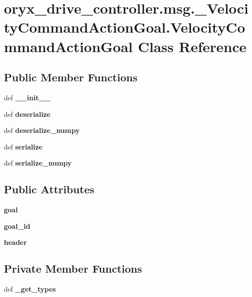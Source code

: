 \section{oryx\-\_\-drive\-\_\-controller.\-msg.\-\_\-\-Velocity\-Command\-Action\-Goal.\-Velocity\-Command\-Action\-Goal \-Class \-Reference}
\label{classoryx__drive__controller_1_1msg_1_1__VelocityCommandActionGoal_1_1VelocityCommandActionGoal}
\subsection*{\-Public \-Member \-Functions}
\begin{DoxyCompactItemize}
\item 
def {\bf \-\_\-\-\_\-init\-\_\-\-\_\-}
\item 
def {\bf deserialize}
\item 
def {\bf deserialize\-\_\-numpy}
\item 
def {\bf serialize}
\item 
def {\bf serialize\-\_\-numpy}
\end{DoxyCompactItemize}
\subsection*{\-Public \-Attributes}
\begin{DoxyCompactItemize}
\item 
{\bf goal}
\item 
{\bf goal\-\_\-id}
\item 
{\bf header}
\end{DoxyCompactItemize}
\subsection*{\-Private \-Member \-Functions}
\begin{DoxyCompactItemize}
\item 
def {\bf \-\_\-get\-\_\-types}
\end{DoxyCompactItemize}
